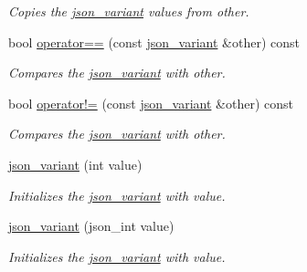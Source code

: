 \begin{DoxyCompactItemize}
\begin{DoxyCompactList}\small\item\em Copies the \hyperlink{classJSONLIB__NAMESPACE_1_1json__variant}{json\+\_\+variant} values from {\ttfamily other}. \end{DoxyCompactList}\item 
bool \hyperlink{classJSONLIB__NAMESPACE_1_1json__variant_aef1fc1a342cc170da06e0d3eb1299aad}{operator==} (const \hyperlink{classJSONLIB__NAMESPACE_1_1json__variant}{json\+\_\+variant} \&other) const
\begin{DoxyCompactList}\small\item\em Compares the \hyperlink{classJSONLIB__NAMESPACE_1_1json__variant}{json\+\_\+variant} with {\ttfamily other}. \end{DoxyCompactList}\item 
bool \hyperlink{classJSONLIB__NAMESPACE_1_1json__variant_a7672a255983f3142523b3680e737d021}{operator!=} (const \hyperlink{classJSONLIB__NAMESPACE_1_1json__variant}{json\+\_\+variant} \&other) const
\begin{DoxyCompactList}\small\item\em Compares the \hyperlink{classJSONLIB__NAMESPACE_1_1json__variant}{json\+\_\+variant} with {\ttfamily other}. \end{DoxyCompactList}\item 
\mbox{\label{classJSONLIB__NAMESPACE_1_1json__variant_aa14f1917c1d801decbdb757ce8a85c9f}} 
\hyperlink{classJSONLIB__NAMESPACE_1_1json__variant_aa14f1917c1d801decbdb757ce8a85c9f}{json\+\_\+variant} (int value)
\begin{DoxyCompactList}\small\item\em Initializes the \hyperlink{classJSONLIB__NAMESPACE_1_1json__variant}{json\+\_\+variant} with {\ttfamily value}. \end{DoxyCompactList}\item 
\mbox{\label{classJSONLIB__NAMESPACE_1_1json__variant_aa1ad17b3c0951853f08485976f44e667}} 
\hyperlink{classJSONLIB__NAMESPACE_1_1json__variant_aa1ad17b3c0951853f08485976f44e667}{json\+\_\+variant} (json\+\_\+int value)
\begin{DoxyCompactList}\small\item\em Initializes the \hyperlink{classJSONLIB__NAMESPACE_1_1json__variant}{json\+\_\+variant} with {\ttfamily value}. \end{DoxyCompactList}\item 

\end{DoxyCompactItemize}
